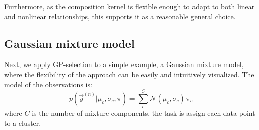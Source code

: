 
Furthermore, as the composition kernel is flexible enough to adapt to both linear and nonlinear relationships, this supports it as a reasonable general choice.


\subsection{Gaussian mixture model}
%
Next, we apply GP-selection to a simple example, a Gaussian mixture model, where the flexibility of the approach can be easily and intuitively visualized.
The model of the observations is:
%
\vspace{-.2cm}
\begin{equation}\label{eq:mog}
p(\vec{y}^{(n)} | \mu_c, \sigma_c, \pi) = \sum_c^{C} \mathcal{N}(\mu_c, \sigma_c) \, \pi_c
\end{equation}
%
where $C$ is the number of mixture components, the task is assign each data point to a cluster.
%


